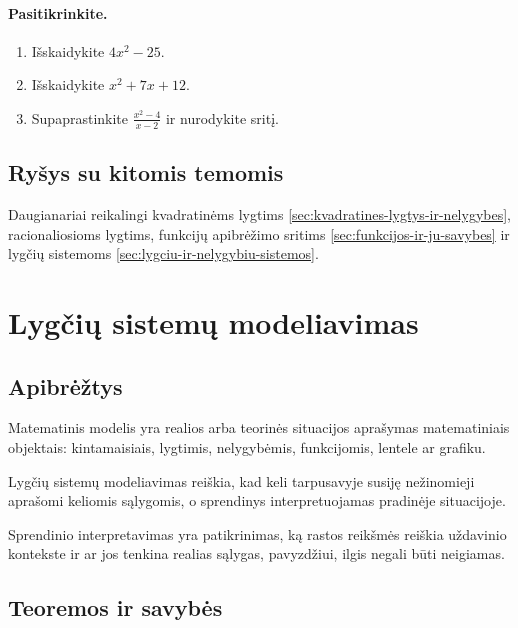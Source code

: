 \paragraph{Pasitikrinkite.}
\begin{enumerate}
\item Išskaidykite $4x^2-25$.
\item Išskaidykite $x^2+7x+12$.
\item Supaprastinkite $\frac{x^2-4}{x-2}$ ir nurodykite sritį.
\end{enumerate}

\subsection{Ryšys su kitomis temomis}

Daugianariai reikalingi kvadratinėms lygtims \ref{sec:kvadratines-lygtys-ir-nelygybes}, racionaliosioms lygtims, funkcijų apibrėžimo sritims \ref{sec:funkcijos-ir-ju-savybes} ir lygčių sistemoms \ref{sec:lygciu-ir-nelygybiu-sistemos}.

\section{Lygčių sistemų modeliavimas}\label{sec:lygciu-sistemu-modeliavimas}

\subsection{Apibrėžtys}

\begin{apibreztis}
Matematinis modelis yra realios arba teorinės situacijos aprašymas matematiniais objektais: kintamaisiais, lygtimis, nelygybėmis, funkcijomis, lentele ar grafiku.
\end{apibreztis}

\begin{apibreztis}
Lygčių sistemų modeliavimas reiškia, kad keli tarpusavyje susiję nežinomieji aprašomi keliomis sąlygomis, o sprendinys interpretuojamas pradinėje situacijoje.
\end{apibreztis}

\begin{apibreztis}
Sprendinio interpretavimas yra patikrinimas, ką rastos reikšmės reiškia uždavinio kontekste ir ar jos tenkina realias sąlygas, pavyzdžiui, ilgis negali būti neigiamas.
\end{apibreztis}

\subsection{Teoremos ir savybės}

